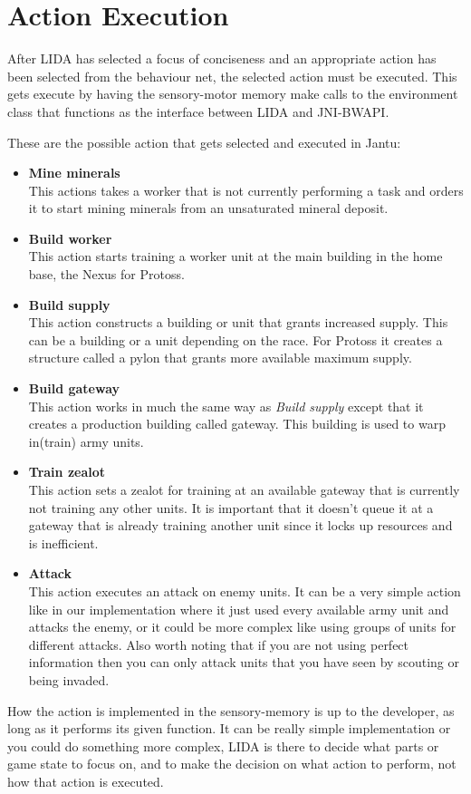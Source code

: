 \section{Action Execution}
\label{sec:actionexecution}
After LIDA has selected a focus of conciseness and an appropriate action has been selected from the behaviour net, the selected action must be executed. This gets execute by having the sensory-motor memory make calls to the environment class that functions as the interface between LIDA and JNI-BWAPI. 

These are the possible action that gets selected and executed in Jantu:
\begin{itemize}
\item \textbf{Mine minerals} \\
This actions takes a worker that is not currently performing a task and orders it to start mining minerals from an unsaturated mineral deposit.
\item \textbf{Build worker} \\
This action starts training a worker unit at the main building in the home base, the Nexus for Protoss. 
\item \textbf{Build supply} \\
This action constructs a building or unit that grants increased supply. This can be a building or a unit depending on the race. For Protoss it creates a structure called a pylon that grants more available maximum supply.  	
\item \textbf{Build gateway} \\
This action works in much the same way as {\em Build supply} except that it creates a production building called gateway. This building is used to warp in(train) army units. 
\item \textbf{Train zealot} \\
This action sets a zealot for training at an available gateway that is currently not training any other units. It is important that it doesn't queue it at a gateway that is already training another unit since it locks up resources and is inefficient. 
\item \textbf{Attack} \\ 
This action executes an attack on enemy units. It can be a very simple action like in our implementation where it just used every available army unit and attacks the enemy, or it could be more complex like using groups of units for different attacks. Also worth noting that if you are not using perfect information then you can only attack units that you have seen by scouting or being invaded. 
\end{itemize}

How the action is implemented in the sensory-memory is up to the developer, as long as it performs its given function. It can be really simple implementation or you could do something more complex, LIDA is there to decide what parts or game state to focus on, and to make the decision on what action to perform, not how that action is executed.
